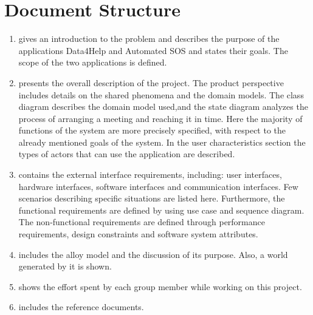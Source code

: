 \section{Document Structure} %
\begin{enumerate} [label={Section \arabic*}]
    \item gives an introduction to the problem and describes the purpose of the applications Data4Help and Automated SOS and states their goals. The scope of the two applications is defined.
    \item presents the overall description of the project. The product perspective includes details on the shared phenomena and the domain models. The class diagram describes the domain model used,and the state diagram analyzes the process of arranging a meeting and reaching it in time. Here the majority of functions of the system are more precisely specified, with respect to the already mentioned goals of the system. In the user characteristics section the types of actors that can use the application are described.
    \item contains the external interface requirements, including: user interfaces, hardware interfaces, software interfaces and communication interfaces. Few scenarios describing specific situations are listed here. Furthermore, the functional requirements are defined by using use case and sequence diagram.
    The non-functional requirements are defined through performance requirements, design constraints and software system attributes.
    \item includes the alloy model and the discussion of its purpose. Also, a world generated by it is shown.
    \item shows the effort spent by each group member while working on this project.
    \item includes the reference documents.
\end{enumerate}